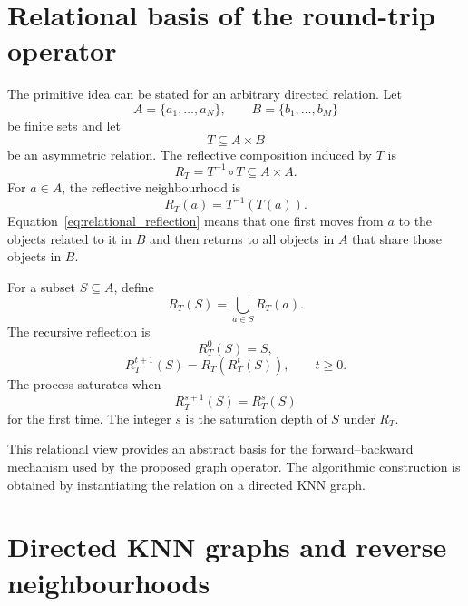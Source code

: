 \documentclass[pdflatex,sn-mathphys-num]{sn-jnl}
\begin{document}
\section{Relational basis of the round-trip operator}\label{sec:relational_origin}

The primitive idea can be stated for an arbitrary directed relation. Let
\begin{equation}
A=\{a_1,\ldots,a_N\},\qquad B=\{b_1,\ldots,b_M\}
\end{equation}
be finite sets and let
\begin{equation}
T\subseteq A\times B
\end{equation}
be an asymmetric relation. The reflective composition induced by $T$ is
\begin{equation}
R_T=T^{-1}\circ T\subseteq A\times A.
\end{equation}
For $a\in A$, the reflective neighbourhood is
\begin{equation}
R_T(a)=T^{-1}(T(a)).
\label{eq:relational_reflection}
\end{equation}
Equation~\eqref{eq:relational_reflection} means that one first moves from $a$ to the objects related to it in $B$ and then returns to all objects in $A$ that share those objects in $B$.

For a subset $S\subseteq A$, define
\begin{equation}
R_T(S)=\bigcup_{a\in S}R_T(a).
\end{equation}
The recursive reflection is
\begin{equation}
R_T^0(S)=S,
\end{equation}
\begin{equation}
R_T^{t+1}(S)=R_T(R_T^t(S)),\qquad t\geq 0.
\label{eq:relational_iteration}
\end{equation}
The process saturates when
\begin{equation}
R_T^{s+1}(S)=R_T^s(S)
\end{equation}
for the first time. The integer $s$ is the saturation depth of $S$ under $R_T$.

This relational view provides an abstract basis for the forward--backward mechanism used by the proposed graph operator. The algorithmic construction is obtained by instantiating the relation on a directed KNN graph.

\section{Directed KNN graphs and reverse neighbourhoods}\label{sec:knn_graph}
\end{document}
